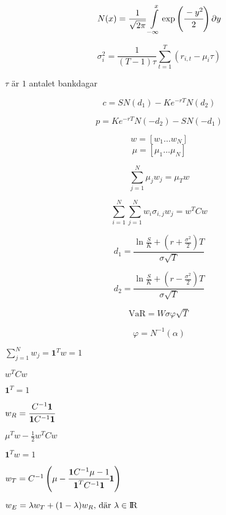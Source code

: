 
\begin{equation}
    N(x)=\frac{1}{\sqrt{2\pi}}\int\displaylimits_{-\infty}^{x}\exp\left({\cfrac{-y^2}{2}}\right)\partial y 
\end{equation}

\begin{equation}
    \sigma_i^2= \frac{1}{(T-1)\tau}\sum\limits_{t=1}^T(r_{i,t}-\mu_i\tau)
\end{equation}

$\tau$ är $1$ antalet bankdagar 


$$c = SN(d_1)-Ke^{-rT}N(d_2) $$


$$p=Ke^{-rT}N(-d_2)- SN(-d_1) $$

$$w =[w_1 \hdots  w_N]$$
$$\mu =[\mu_1 \hdots  \mu_N]$$

$$\displaystyle\sum_{j=1}^{N}\mu_jw_j = \mu_T w$$

$$\displaystyle\sum_{i=1}^{N} \displaystyle\sum_{j=1}^{N} w_i \sigma_{i,j} w_j = w^TCw$$

$$d_1=\frac{\ln{\frac{S}{K}}+(r+\frac{\sigma^2}{2})T}{\sigma\sqrt{T}}$$

$$d_2=\frac{\ln{\frac{S}{K}}+(r-\frac{\sigma^2}{2})T}{\sigma\sqrt{T}}$$


$$\text{VaR} = W\sigma\varphi\sqrt{T}$$

$$\varphi=N^{-1}(\alpha)$$

$\displaystyle\sum_{j=1}^N w_j = \textbf{1}^T w = 1$

$w^TCw$

$\textbf{1}^T=1$

$w_R = \cfrac{ C^{-1}\textbf{1}}{\textbf{1}C^{-1}\textbf{1}}$

$\mu^Tw-\frac{1}{2}w^TCw$

$\textbf{1}^Tw=1$

$w_T= C^{-1} \left( \mu - \cfrac{\textbf{1} C^{-1} \mu -1}{\textbf{1}^T C^{-1}\textbf{1}}\textbf{1} \right)$

$w_E = \lambda w_T + (1-\lambda) w_R\text{, där }\lambda \in {\rm I\!R}$
